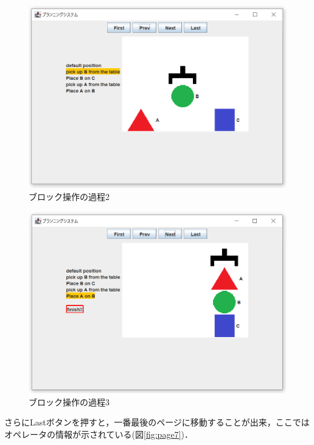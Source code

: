 \documentclass[12pt]{jarticle}
\begin{document}
\begin{figure}[htbp]
  \begin{center}
    \includegraphics[scale=0.6]{images/page3.PNG}
    \caption{ブロック操作の過程2}
    \label{fig:page3}
  \end{center}
\end{figure}
\begin{figure}[htbp]
  \begin{center}
    \includegraphics[scale=0.6]{images/page6.PNG}
    \caption{ブロック操作の過程3}
    \label{fig:page6}
  \end{center}
\end{figure}
\clearpage
さらにLastボタンを押すと，一番最後のページに移動することが出来，ここではオペレータの情報が示されている(図\ref{fig:page7})．
\end{document}

